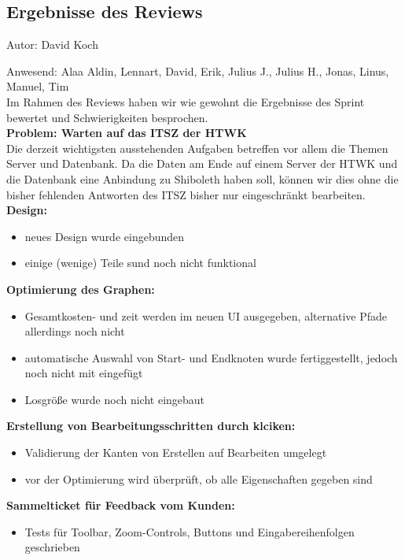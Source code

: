 \subsection{Ergebnisse des Reviews}
{\small Autor: David Koch}

Anwesend: Alaa Aldin, Lennart, David, Erik, Julius J., Julius H., Jonas, Linus, Manuel, Tim\\

Im Rahmen des Reviews haben wir wie gewohnt die Ergebnisse des Sprint bewertet und Schwierigkeiten besprochen.\\

\textbf{Problem: Warten auf das ITSZ der HTWK}\\
Die derzeit wichtigsten ausstehenden Aufgaben betreffen vor allem die Themen Server und Datenbank. Da die Daten am Ende auf einem Server der HTWK und die Datenbank eine Anbindung zu Shiboleth haben soll, können wir dies ohne die bisher fehlenden Antworten des ITSZ bisher nur eingeschränkt bearbeiten. \\

\textbf{Design:}
\begin{itemize}
\item neues Design wurde eingebunden
\item einige (wenige) Teile sund noch nicht funktional 
\end{itemize}

\textbf{Optimierung des Graphen:}
\begin{itemize}
\item Gesamtkosten- und zeit werden im neuen UI ausgegeben, alternative Pfade allerdings noch nicht
\item automatische Auswahl von Start- und Endknoten wurde fertiggestellt, jedoch noch nicht mit eingefügt
\item Losgröße wurde noch nicht eingebaut
\end{itemize}

\textbf{Erstellung von Bearbeitungsschritten durch klciken:}
\begin{itemize}
\item Validierung der Kanten von Erstellen auf Bearbeiten umgelegt
\item vor der Optimierung wird überprüft, ob alle Eigenschaften gegeben sind
\end{itemize}

\textbf{Sammelticket für Feedback vom Kunden:}
\begin{itemize}
\item Tests für Toolbar, Zoom-Controls, Buttons und Eingabereihenfolgen geschrieben
\end{itemize}

